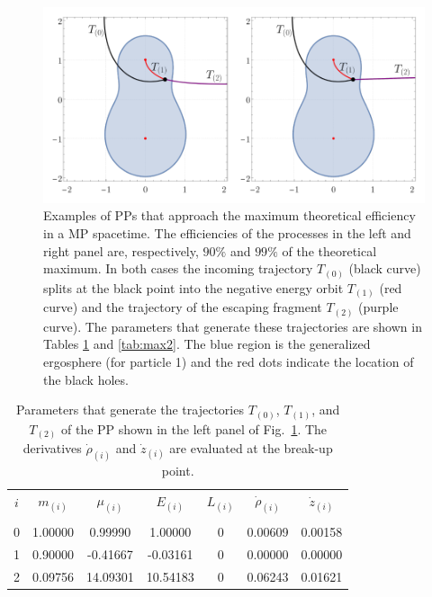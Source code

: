 \begin{figure}[!ht]
  \centering
  \includegraphics[width=\linewidth]{img/penrose_binaries/fig11.pdf}
  \caption{Examples of PPs that approach the maximum theoretical efficiency in a MP spacetime. The efficiencies of the processes in the left and right panel are, respectively, $90 \%$ and $99 \%$ of the theoretical maximum. In both cases the incoming trajectory $T_{(0)}$ (black curve) splits at the black point into the negative energy orbit $T_{(1)}$ (red curve) and the trajectory of the escaping fragment $T_{(2)}$ (purple curve). The parameters that generate these trajectories are shown in Tables \ref{tab:max1} and \ref{tab:max2}. The blue region is the generalized ergosphere (for particle 1) and the red dots indicate the location of the black holes.}
  \label{fig:examplemax1}
\end{figure}

\begin{table}[h]
  \centering
  \begin{tabular}{ccccccc}
    \hline\hline
    $i$ & $m_{(i)}$ & $\mu_{(i)}$ & $E_{(i)}$ & $L_{(i)}$ & $\dot{\rho}_{(i)}$ & $\dot{z}_{(i)}$ \\ \vspace{-0.3cm} \\
    0   & 1.00000   & 0.99990     & 1.00000   & 0         & 0.00609            & 0.00158         \\
    1   & 0.90000   & -0.41667    & -0.03161  & 0         & 0.00000            & 0.00000         \\
    2   & 0.09756   & 14.09301    & 10.54183  & 0         & 0.06243            & 0.01621         \\
    \hline\hline
  \end{tabular}
  \caption{Parameters that generate the trajectories $T_{(0)}$, $T_{(1)}$, and $T_{(2)}$ of the PP shown in the left panel of Fig.~\ref{fig:examplemax1}. The derivatives $\dot{\rho}_{(i)}$ and $\dot{z}_{(i)}$ are evaluated at the break-up point.
  }
  \label{tab:max1}
\end{table}

